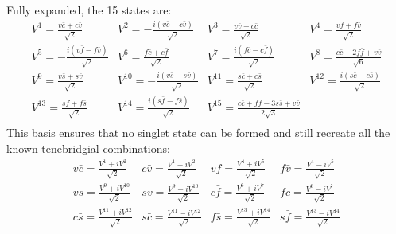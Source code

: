 Fully expanded, the 15 states are:
\[
  \begin{array}{cccc}
    V^1=\frac{v \bar{c}+c \bar{v}}{\sqrt{2}}                 & V^2=-\frac{i \left(v \bar{c}-c \bar{v}\right)}{\sqrt{2}}    & V^3=\frac{v \bar{v}-c \bar{c}}{\sqrt{2}}                            & V^4=\frac{v \bar{f}+f \bar{v}}{\sqrt{2}}                   \\
    V^5=-\frac{i \left(v \bar{f}-f \bar{v}\right)}{\sqrt{2}} & V^6=\frac{f \bar{c}+c \bar{f}}{\sqrt{2}}                    & V^7=\frac{i \left(f \bar{c}-c \bar{f}\right)}{\sqrt{2}}             & V^8=\frac{c \bar{c}-2 f \bar{f}+v \bar{v}}{\sqrt{6}}       \\
    V^9=\frac{v \bar{s}+s \bar{v}}{\sqrt{2}}                 & V^{10}=-\frac{i \left(v \bar{s}-s \bar{v}\right)}{\sqrt{2}} & V^{11}=\frac{s \bar{c}+c \bar{s}}{\sqrt{2}}                         & V^{12}=\frac{i \left(s \bar{c}-c \bar{s}\right)}{\sqrt{2}} \\
    V^{13}=\frac{s \bar{f}+f \bar{s}}{\sqrt{2}}              & V^{14}=\frac{i \left(s \bar{f}-f \bar{s}\right)}{\sqrt{2}}  & V^{15}=\frac{c \bar{c}+f \bar{f}-3 s \bar{s}+v \bar{v}}{2 \sqrt{3}} & \text{}                                                    \\
  \end{array}
\]
This basis ensures that no singlet state can be formed and still recreate all the known tenebridgial combinations:
\[
  \begin{array}{cccc}
    v\bar{c} = \frac{V^1+iV^2}{\sqrt{2}}
     & c\bar{v} = \frac{V^1-iV^2}{\sqrt{2}}
     & v\bar{f} = \frac{V^4+iV^5}{\sqrt{2}}
     & f\bar{v} = \frac{V^4-iV^5}{\sqrt{2}}       \\
    v\bar{s} = \frac{V^9+iV^{10}}{\sqrt{2}}
     & s\bar{v} = \frac{V^{9}-iV^{10}}{\sqrt{2}}
     & c\bar{f} = \frac{V^{6}+iV^{7}}{\sqrt{2}}
     & f\bar{c} = \frac{V^{6}-iV^{7}}{\sqrt{2}}   \\
    c\bar{s} = \frac{V^{11}+iV^{12}}{\sqrt{2}}
     & s\bar{c} = \frac{V^{11}-iV^{12}}{\sqrt{2}}
     & f\bar{s} = \frac{V^{13}+iV^{14}}{\sqrt{2}}
     & s\bar{f} = \frac{V^{13}-iV^{14}}{\sqrt{2}}
  \end{array}
\]

